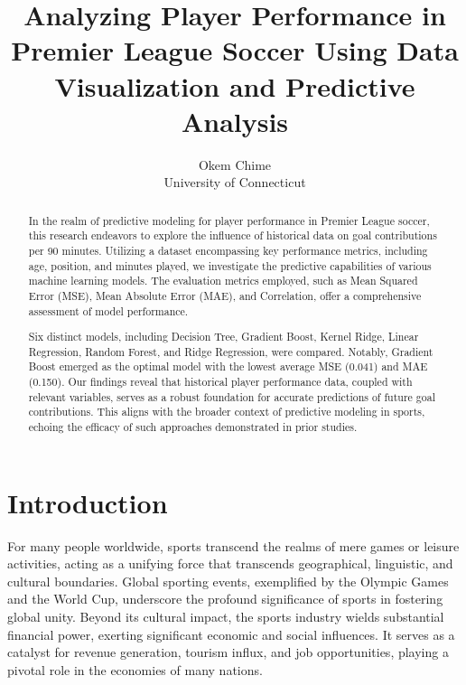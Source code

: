 \documentclass[12pt]{article}
\title{Analyzing Player Performance in Premier League Soccer Using 
Data Visualization and Predictive Analysis}
\author{Okem Chime\\
  University of Connecticut
}
\begin{document}
\maketitle

\begin{abstract}

In the realm of predictive modeling for player performance in Premier League
soccer, this research endeavors to explore the influence of historical data on
goal contributions per 90 minutes. Utilizing a dataset encompassing key
performance metrics, including age, position, and minutes played, we investigate
the predictive capabilities of various machine learning models. The evaluation
metrics employed, such as Mean Squared Error (MSE), Mean Absolute Error (MAE),
and Correlation, offer a comprehensive assessment of model performance.

Six distinct models, including Decision Tree, Gradient Boost, Kernel Ridge,
Linear Regression, Random Forest, and Ridge Regression, were compared. Notably,
Gradient Boost emerged as the optimal model with the lowest average MSE (0.041)
and MAE (0.150). Our findings reveal that historical player performance data,
coupled with relevant variables, serves as a robust foundation for accurate
predictions of future goal contributions. This aligns with the broader context
of predictive modeling in sports, echoing the efficacy of such approaches
demonstrated in prior studies.

\end{abstract}


\section{Introduction}
\label{sec:intro}




For many people worldwide, sports transcend the realms of mere games or leisure
activities, acting as a unifying force that transcends geographical, linguistic,
and cultural boundaries. Global sporting events, exemplified by the Olympic Games
and the World Cup, underscore the profound significance of sports in fostering
global unity. Beyond its cultural impact, the sports industry wields substantial
financial power, exerting significant economic and social influences. It serves
as a catalyst for revenue generation, tourism influx, and job opportunities,
playing a pivotal role in the economies of many nations.
\end{document}
